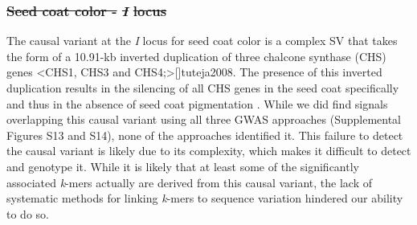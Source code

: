 \documentclass{article}
\providecommand{\DIFdeltex}[1]{{\protect\color{red}\sout{#1}}}                      %
\providecommand{\DIFdelbegin}{} %
\providecommand{\DIFdelend}{} %
\providecommand{\DIFdel}[1]{\texorpdfstring{\DIFdeltex{#1}}{}} %
\newcommand{\DIFscaledelfig}{0.5}
\newlength{\DIFdelgraphicswidth} %
\newlength{\DIFdelgraphicsheight} %
\newcommand{\DIFdelincludegraphics}[2][]{%
\sbox{\DIFdelgraphicsbox}{\DIFOincludegraphics[#1]{#2}}%
\settoboxwidth{\DIFdelgraphicswidth}{\DIFdelgraphicsbox} %
\settoboxtotalheight{\DIFdelgraphicsheight}{\DIFdelgraphicsbox} %
\scalebox{\DIFscaledelfig}{%
\parbox[b]{\DIFdelgraphicswidth}{\usebox{\DIFdelgraphicsbox}\\[-\baselineskip] \rule{\DIFdelgraphicswidth}{0em}}\llap{\resizebox{\DIFdelgraphicswidth}{\DIFdelgraphicsheight}{%
\setlength{\unitlength}{\DIFdelgraphicswidth}%
\begin{picture}(1,1)%
\thicklines\linethickness{2pt} %
{\color[rgb]{1,0,0}\put(0,0){\framebox(1,1){}}}%
{\color[rgb]{1,0,0}\put(0,0){\line( 1,1){1}}}%
{\color[rgb]{1,0,0}\put(0,1){\line(1,-1){1}}}%
\end{picture}%
}\hspace*{3pt}}} %
} %
\DeclareRobustCommand{\DIFdelbegin}{\DIFOdelbegin \let\includegraphics\DIFdelincludegraphics} %
\DeclareRobustCommand{\DIFdelend}{\DIFOaddend \let\includegraphics\DIFOincludegraphics} %
\begin{document}
\DIFdelbegin %

\subsubsection*{\DIFdel{Seed coat color - }\textit{\DIFdel{I}} %
\DIFdel{locus}}

\DIFdelend %
The causal variant at the \textit{I} locus for seed coat color is a complex SV
that takes the form of a 10.91-kb inverted duplication of three chalcone
synthase (CHS) genes \shortcite<CHS1, CHS3 and CHS4;>[]{tuteja2008}. The presence of
this inverted duplication results in the silencing of all CHS genes in the seed
coat specifically and thus in the absence of seed coat pigmentation
. While we did find signals overlapping this causal variant
using all three GWAS approaches (Supplemental Figures S13 and
S14), none of the approaches identified
it. This failure to detect the causal variant is likely due
to its complexity, which makes it difficult to detect and genotype it. While it
is likely that at least some of the significantly associated \textit{k}-mers
actually are derived from this causal variant, the lack of systematic methods for
linking \textit{k}-mers to sequence variation hindered our ability to do so.
\end{document}
